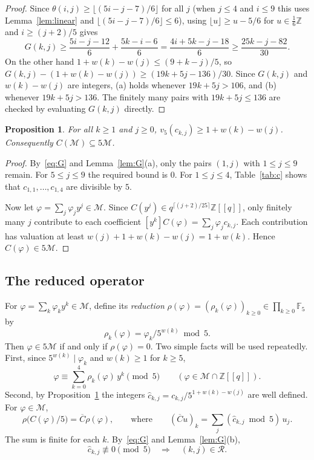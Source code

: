 \documentclass[11pt]{article}
\newtheorem{proposition}[theorem]{Proposition}
\theoremstyle{definition}
\theoremstyle{remark}
\numberwithin{equation}{section}
\newcommand{\Mod}{\mathscr{M}}
\newcommand{\Cb}{\overline{C}}
\newcommand{\Z}{\mathbb{Z}}
\newcommand{\F}{\mathbb{F}}
\begin{document}
\begin{proof}
Since $\theta(i,j)\ge\lfloor(5i-j-7)/6\rfloor$ for all $j$ (when $j\le4$ and $i\le9$ this uses Lemma~\ref{lem:linear} and $\lfloor(5i-j-7)/6\rfloor\le6$), using $\lfloor u\rfloor\ge u-5/6$ for $u\in\frac16\Z$ and $i\ge(j+2)/5$ gives
\[
G(k,j)\ge\frac{5i-j-12}6+\frac{5k-i-6}6=\frac{4i+5k-j-18}{6}\ge\frac{25k-j-82}{30}.
\]
On the other hand $1+w(k)-w(j)\le(9+k-j)/5$, so $G(k,j)-(1+w(k)-w(j))\ge(19k+5j-136)/30$. Since $G(k,j)$ and $w(k)-w(j)$ are integers, (a) holds whenever $19k+5j>106$, and (b) whenever $19k+5j>136$. The finitely many pairs with $19k+5j\le136$ are checked by evaluating $G(k,j)$ directly.
\end{proof}

\begin{proposition}\label{prop:contract}
For all $k\ge1$ and $j\ge0$, $v_5(c_{k,j})\ge1+w(k)-w(j)$. Consequently $C(\Mod)\subseteq5\Mod$.
\end{proposition}

\begin{proof}
By~\eqref{eq:G} and Lemma~\ref{lem:G}(a), only the pairs $(1,j)$ with $1\le j\le9$ remain. For $5\le j\le9$ the required bound is $0$. For $1\le j\le4$, Table~\ref{tab:c} shows that $c_{1,1},\dots,c_{1,4}$ are divisible by $5$.

Now let $\varphi=\sum_j\varphi_jy^j\in\Mod$. Since $C(y^j)\in q^{\lceil(j+2)/25\rceil}\Z[[q]]$, only finitely many $j$ contribute to each coefficient $[y^k]C(\varphi)=\sum_j\varphi_jc_{k,j}$. Each contribution has valuation at least $w(j)+1+w(k)-w(j)=1+w(k)$. Hence $C(\varphi)\in5\Mod$.
\end{proof}

\subsection*{The reduced operator}
For $\varphi=\sum_k\varphi_ky^k\in\Mod$, define its \emph{reduction} $\rho(\varphi)=(\rho_k(\varphi))_{k\ge0}\in\prod_{k\ge0}\F_5$ by
\[
\rho_k(\varphi)=\varphi_k/5^{w(k)}\bmod5.
\]
Then $\varphi\in5\Mod$ if and only if $\rho(\varphi)=0$. Two simple facts will be used repeatedly. First, since $5^{w(k)}\mid\varphi_k$ and $w(k)\ge1$ for $k\ge5$,
\begin{equation}\label{eq:reduce}
\varphi\equiv\sum_{k=0}^4\rho_k(\varphi)\,y^k\pmod5\qquad(\varphi\in\Mod\cap\Z[[q]]).
\end{equation}
Second, by Proposition~\ref{prop:contract} the integers $\hat c_{k,j}=c_{k,j}/5^{1+w(k)-w(j)}$ are well defined. For $\varphi\in\Mod$,
\begin{equation}\label{eq:Cbar}
\rho\bigl(C(\varphi)/5\bigr)=\Cb\rho(\varphi),\qquad\text{where}\qquad(\Cb u)_k=\sum_{j}(\hat c_{k,j}\bmod5)\,u_j.
\end{equation}
The sum is finite for each $k$. By~\eqref{eq:G} and Lemma~\ref{lem:G}(b),
\begin{equation}\label{eq:support}
\hat c_{k,j}\not\equiv0\pmod5\quad\Longrightarrow\quad(k,j)\in\mathcal{R}.
\end{equation}
\end{document}
